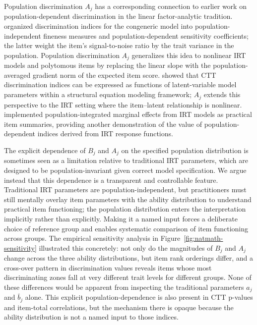 \documentclass[man, 12pt, floatsintext]{apa7}
\begin{document}
Population discrimination $A_j$ has a corresponding connection to earlier work on population-dependent discrimination in the linear factor-analytic tradition. \textcite{Ferrando2012} organized discrimination indices for the congeneric model into population-independent fineness measures and population-dependent sensitivity coefficients; the latter weight the item's signal-to-noise ratio by the trait variance in the population. Population discrimination $A_j$ generalizes this idea to nonlinear IRT models and polytomous items by replacing the linear slope with the population-averaged gradient norm of the expected item score. \textcite{MaydeuOlivares2011} showed that CTT discrimination indices can be expressed as functions of latent-variable model parameters within a structural equation modeling framework; $A_j$ extends this perspective to the IRT setting where the item--latent relationship is nonlinear. \textcite{Mize2024} implemented population-integrated marginal effects from IRT models as practical item summaries, providing another demonstration of the value of population-dependent indices derived from IRT response functions.

The explicit dependence of $B_j$ and $A_j$ on the specified population distribution is sometimes seen as a limitation relative to traditional IRT parameters, which are designed to be population-invariant given correct model specification. We argue instead that this dependence is a transparent and controllable feature. Traditional IRT parameters are population-independent, but practitioners must still mentally overlay item parameters with the ability distribution to understand practical item functioning; the population distribution enters the interpretation implicitly rather than explicitly. Making it a named input forces a deliberate choice of reference group and enables systematic comparison of item functioning across groups. The empirical sensitivity analysis in Figure~\ref{fig:natmath-sensitivity} illustrated this concretely: not only do the magnitudes of $B_j$ and $A_j$ change across the three ability distributions, but item rank orderings differ, and a cross-over pattern in discrimination values reveals items whose most discriminating zones fall at very different trait levels for different groups. None of these differences would be apparent from inspecting the traditional parameters $a_j$ and $\bar{b}_j$ alone. This explicit population-dependence is also present in CTT p-values and item-total correlations, but the mechanism there is opaque because the ability distribution is not a named input to those indices.
\end{document}
